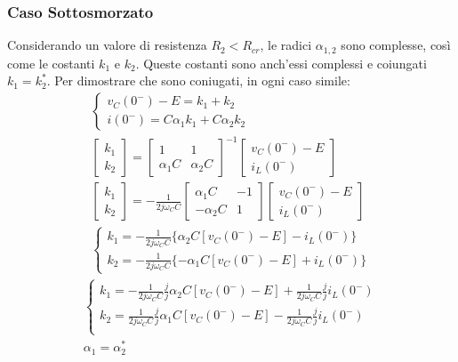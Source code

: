 \documentclass{article}
\numberwithin{equation}{subsection}
\begin{document}
\subsubsection{Caso Sottosmorzato}
Considerando un valore di resistenza $R_2<R_{cr}$, le radici $\alpha_{1,2}$ sono complesse, così come le costanti $k_1$ e $k_2$. Queste costanti sono anch'essi 
complessi e coiungati $k_1=k_2^*$. Per dimostrare che sono coniugati, in ogni caso simile:
\begin{gather*}
    \begin{cases}
        v_C(0^-)-E=k_1+k_2\\
        i(0^-)=C\alpha_1k_1+C\alpha_2k_2
    \end{cases}\\
    \begin{bmatrix}
        k_1\\k_2
    \end{bmatrix}=
    \begin{bmatrix}
        1&1\\\alpha_1C&\alpha_2C 
    \end{bmatrix}^{-1}
    \begin{bmatrix}
        v_C(0^-)-E\\i_L(0^-)
    \end{bmatrix}\\
    \begin{bmatrix}
        k_1\\k_2
    \end{bmatrix}=\displaystyle-\frac{1}{2j\omega_CC}
    \begin{bmatrix}
        \alpha_1C&-1\\-\alpha_2C&1
    \end{bmatrix}
    \begin{bmatrix}
        v_C(0^-)-E\\i_L(0^-)
    \end{bmatrix}\\
    \begin{cases}
        k_1=\displaystyle-\frac{1}{2j\omega_C C}\{\alpha_2C[v_C(0^-)-E]-i_L(0^-)\}\\
        k_2=\displaystyle-\frac{1}{2j\omega_C C}\{-\alpha_1C[v_C(0^-)-E]+i_L(0^-)\}
    \end{cases}
\end{gather*}
\begin{gather*}
    \begin{cases}
        k_1=\displaystyle-\frac{1}{2j\omega_CC}\frac{j}{j}\alpha_2C[v_C(0^-)-E]+\frac{1}{2j\omega_CC}\frac{j}{j}i_L(0^-)\\
        k_2=\displaystyle\frac{1}{2j\omega_CC}\frac{j}{j}\alpha_1C[v_C(0^-)-E]-\frac{1}{2j\omega_CC}\frac{j}{j}i_L(0^-)\\
    \end{cases}\\
    \alpha_1=\alpha_2^*
\end{gather*}
\end{document}
